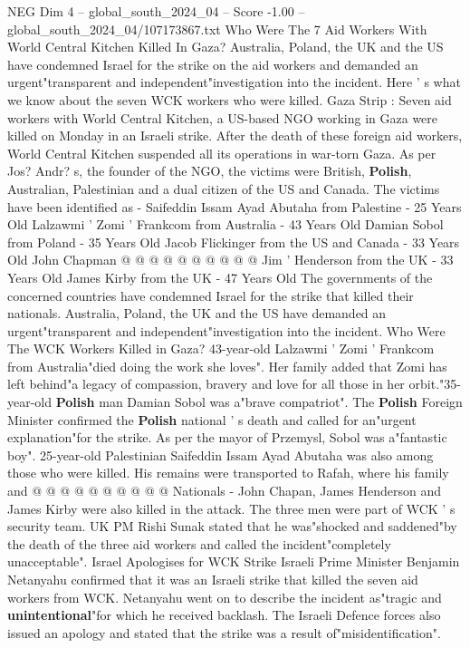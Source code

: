 \begin{textsample}{NEG Dim 4 – global\_south\_2024\_04 – Score -1.00 – global\_south\_2024\_04/107173867.txt}  \label{ex:f4_neg_193}
Who Were The 7 Aid Workers With World Central Kitchen Killed In Gaza?
Australia, Poland, the UK and the US have condemned Israel for the strike on the aid workers and demanded an urgent"transparent and independent"investigation into the incident.
Here ' s what we know about the seven WCK workers who were killed.
Gaza Strip : Seven aid workers with World Central Kitchen, a US-based NGO working in Gaza were killed on Monday in an Israeli strike.
After the death of these foreign aid workers, World Central Kitchen suspended all its operations in war-torn Gaza.
As per Jos?
Andr? s, the founder of the NGO, the victims were British, \textbf{Polish}, Australian, Palestinian and a dual citizen of the US and Canada.
The victims have been identified as - Saifeddin Issam Ayad Abutaha from Palestine - 25 Years Old Lalzawmi ' Zomi ' Frankcom from Australia - 43 Years Old Damian Sobol from Poland - 35 Years Old Jacob Flickinger from the US and Canada - 33 Years Old John Chapman @ @ @ @ @ @ @ @ @ @ Jim ' Henderson from the UK - 33 Years Old James Kirby from the UK - 47 Years Old The governments of the concerned countries have condemned Israel for the strike that killed their nationals.
Australia, Poland, the UK and the US have demanded an urgent"transparent and independent"investigation into the incident.
Who Were The WCK Workers Killed in Gaza? 43-year-old Lalzawmi ' Zomi ' Frankcom from Australia"died doing the work she loves".
Her family added that Zomi has left behind"a legacy of compassion, bravery and love for all those in her orbit."35-year-old \textbf{Polish} man Damian Sobol was a"brave compatriot".
The \textbf{Polish} Foreign Minister confirmed the \textbf{Polish} national ' s death and called for an"urgent explanation"for the strike.
As per the mayor of Przemysl, Sobol was a"fantastic boy". 25-year-old Palestinian Saifeddin Issam Ayad Abutaha was also among those who were killed.
His remains were transported to Rafah, where his family and @ @ @ @ @ @ @ @ @ @ Nationals - John Chapan, James Henderson and James Kirby were also killed in the attack.
The three men were part of WCK ' s security team.
UK PM Rishi Sunak stated that he was"shocked and saddened"by the death of the three aid workers and called the incident"completely unacceptable".
Israel Apologises for WCK Strike Israeli Prime Minister Benjamin Netanyahu confirmed that it was an Israeli strike that killed the seven aid workers from WCK.
Netanyahu went on to describe the incident as"tragic and \textbf{unintentional}"for which he received backlash.
The Israeli Defence forces also issued an apology and stated that the strike was a result of"misidentification".

\end{textsample}
